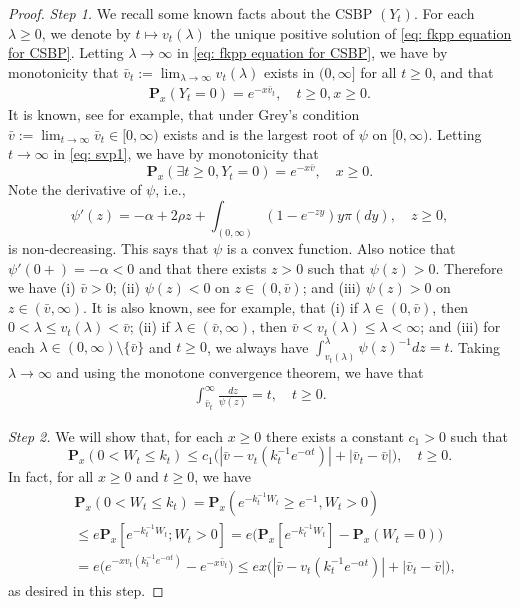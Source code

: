 \documentclass[EJP]{ejpecp} %
\begin{document}
\begin{proof}
  \emph{Step 1.}
  We recall some known facts about the CSBP $(Y_t)$.
  For each $\lambda \geq 0$, we denote by $t\mapsto v_t(\lambda)$ the unique positive solution of \eqref{eq: fkpp equation for CSBP}.
  Letting $\lambda \to \infty$ in \eqref{eq: fkpp equation for CSBP}, we have by monotonicity that $\bar v_t:= \lim_{\lambda \to \infty}v_t(\lambda)$ exists in $(0,\infty]$ for all $t\geq 0$, and that
  \begin{align}
    \label{eq: svp1}
    \mathbf P_x(Y_t = 0)=e^{-x\bar v_t}, \quad t\geq 0, x\ge 0.
  \end{align}
  It is known, see \cite[Theorems 3.5--3.8]{Li2011Measure-valued} for example, that under Grey's condition $\bar v:= \lim_{t\to \infty} \bar v_t \in [0,\infty)$ exists and is the largest root of $\psi$ on $[0,\infty)$.
  Letting $t \to \infty$ in \eqref{eq: svp1}, we have by monotonicity that
  \[
    \mathbf P_x(\exists t \geq 0, Y_t = 0)
    = e^{-x\bar v}, \quad x\geq 0.
  \]
 Note the derivative of $\psi$, i.e.,
  \[
    \psi'(z)
    = -\alpha + 2\rho z + \int_{(0,\infty)}(1-e^{-zy})y\pi(dy),\quad z\geq 0,
  \]
  is non-decreasing.
  This says that $\psi$ is a convex function.
  Also notice that $\psi'(0+)=-\alpha <0$ and that there exists $z>0$ such that $\psi(z)>0$.
  Therefore we have (i) $\bar v > 0$; (ii) $\psi(z) < 0$ on $z\in (0,\bar v)$; and (iii) $\psi(z) > 0 $ on $z\in (\bar v, \infty)$.
  It is also known, see \cite[Proposition 3.3]{Li2011Measure-valued} for example, that (i) if $\lambda \in (0,\bar v)$, then $0<\lambda \leq v_t(\lambda)<\bar v $; (ii) if $\lambda \in (\bar v, \infty)$, then $\bar v < v_t(\lambda)\leq \lambda< \infty$; and (iii) for each $\lambda \in (0,\infty)\setminus \{\bar v\}$ and $t\geq 0$, we always have
    \(
      \int_{v_t(\lambda)}^\lambda  \psi(z)^{-1}dz = t.
    \)
  Taking $\lambda \to \infty$ and using the monotone convergence theorem, we have that
  \begin{align}
    \label{eq:svp2}
    \int_{\bar v_t}^\infty \frac{dz}{\psi(z)} = t, \quad t\geq 0.
  \end{align}

  \emph{Step 2.} We will show that, for each $x \geq 0$ there exists a constant $c_1>0$ such that
  \[
    \mathbf P_{x}(0< W_t\leq k_t)
    \leq c_1\big(|\bar v- v_t(k_t^{-1}e^{-\alpha t})|+|\bar v_t - \bar v|\big),
    \quad t\geq 0.
  \]
  In fact, for all $x\geq 0$ and $t\geq 0$, we have
  \begin{align}
    & \mathbf P_{x}(0<W_t \leq k_t)
      = \mathbf P_{x}( e^{-k_t^{-1}W_t}\geq e^{-1},W_t > 0) \\
    & \leq e \mathbf P_{x}[e^{-k_t^{-1} W_t};W_t > 0]
      =  e\big(\mathbf P_x[e^{-k_t^{-1} W_t}]-\mathbf P_x(W_t = 0)\big) \\
    & = e\big(e^{-xv_t(k_t^{-1} e^{-\alpha t})}-e^{-x\bar v_t}\big)
      \leq ex \big(|\bar v-v_t(k_t^{-1} e^{-\alpha t})|+ |\bar v_t- \bar v|\big),
  \end{align}
  as desired in this step.


\end{proof}
\end{document}
